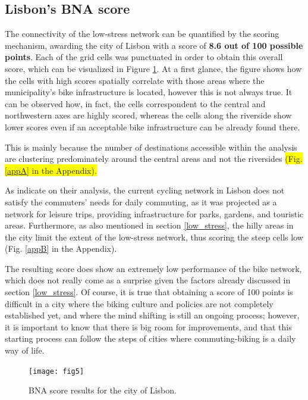 \documentclass[information,article,submit,moreauthors,Latex,dvi2pdf,10pt,a4paper]{Definitions/mdpi}
\begin{document}
\subsection{Lisbon's BNA score} \label{lisbon_bna}

The connectivity of the low-stress network can be quantified by the scoring mechanism, awarding the city of Lisbon with a score of \textbf{8.6 out of 100 possible points}. Each of the grid cells was punctuated in order to obtain this overall score, which can be visualized in Figure \ref{fig5}. At a first glance, the figure shows how the cells with high scores spatially correlate with those areas where the municipality's bike infrastructure is located, however this is not always true. It can be observed how, in fact, the cells correspondent to the central and northwestern axes are highly scored, whereas the cells along the riverside show lower scores even if an acceptable bike infrastructure can be already found there.

This is mainly because the number of destinations accessible within the analysis are clustering predominately around the central areas and not the riversides \colorbox{yellow}{(Fig. \ref{appA} in the Appendix).}

\begin{mycolorbox}[colback=yellow]
As \cite{Moura2017} indicate on their analysis, the current cycling network in Lisbon does not satisfy the commuters' needs for daily commuting, as it was projected as a network for leisure trips, providing infrastructure for parks, gardens, and touristic areas. Furthermore, as also mentioned in section \ref{low_stress}, the hilly areas in the city limit the extent of the low-stress network, thus scoring the steep cells low (Fig. \ref{appB} in the Appendix).
\end{mycolorbox}

The resulting score does show an extremely low performance of the bike network, which does not really come as a surprise given the factors already discussed in section \ref{low_stress}. Of course, it is true that obtaining a score of 100 points is difficult in a city where the biking culture and policies are not completely established yet, and where the mind shifting is still an ongoing process; however, it is important to know that there is big room for improvements, and that this starting process can follow the steps of cities where commuting-biking is a daily way of life.

\begin{figure}[ht!]
	\begin{center}
		\texttt{[image: fig5]}
		\caption{BNA score results for the city of Lisbon.}
		\label{fig5}
	\end{center}
\end{figure}
\end{document}
